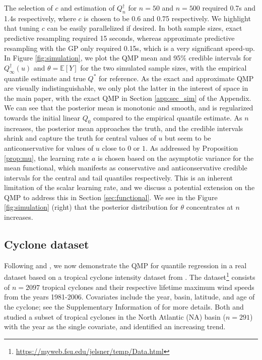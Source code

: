 \documentclass[11pt,a4paper]{article}
\newcommand{\E}{\mathbb{E}}
\begin{document}
The selection of $c$ and estimation of $Q_n^{\dagger}$ for $n = 50$ and $n = 500$ required 0.7s and 1.4s respectively, where $c$ is chosen to be 0.6 and 0.75 respectively. We highlight that tuning $c$ can be easily parallelized if desired. In both sample sizes, exact predictive resampling required 15 seconds, whereas approximate predictive resampling with the GP only required 0.15s, which is a very significant speed-up. In {Figure \ref{fig:simulation}}, we plot the QMP mean and 95\% credible intervals for $Q_\infty^{\dagger}(u)$ and $\theta = \E[Y]$ for the two simulated sample sizes, with the empirical quantile estimate and true $Q^*$ for reference. As the exact and approximate QMP are visually indistinguishable, we only plot the latter in the interest of space in the main paper, with the exact QMP in Section \ref{app:sec_sim} of the Appendix.  
We can see that the posterior mean is monotonic and smooth, and is  regularized towards the initial linear $Q_0$ compared to the empirical quantile estimate.  As $n$ increases, the posterior mean approaches the truth, and the credible intervals shrink and capture the truth for central values of $u$ but 
seem to be anticonservative for values of $u$ close to $0$ or $1$.  As addressed by {Proposition \ref{prop:mu}}, the learning rate $a$ is chosen based on the asymptotic variance for the mean functional, which manifests as conservative and anticonservative credible intervals for the central and tail quantiles respectively. 
This is an inherent limitation of the scalar learning rate, and we discuss a potential extension on the QMP to address this in Section \ref{sec:functional}. 
We see in the {Figure \ref{fig:simulation} (right)} that the posterior distribution for $\theta$ concentrates at $n$ increases.\vspace{5mm}





\subsection{Cyclone dataset}
Following \cite{Tokdar2012} and \cite{An2024}, we now demonstrate the QMP for quantile regression in a real dataset based on a tropical cyclone intensity dataset from \cite{Elsner2008}. The dataset\footnote{\href{https://myweb.fsu.edu/jelsner/temp/Data.html}{https://myweb.fsu.edu/jelsner/temp/Data.html}} consists of $n = 2097$ tropical cyclones and their respective lifetime maximum wind speeds from the years 1981-2006. Covariates include the year, basin, latitude, and age of the cyclone; see the Supplementary Information of \cite{Elsner2008} for more details. Both \cite{Tokdar2012} and \cite{An2024} studied a subset of tropical cyclones in the North Atlantic (NA) basin ($n = 291$) with the year as the single covariate, and identified an increasing trend.
\end{document}

